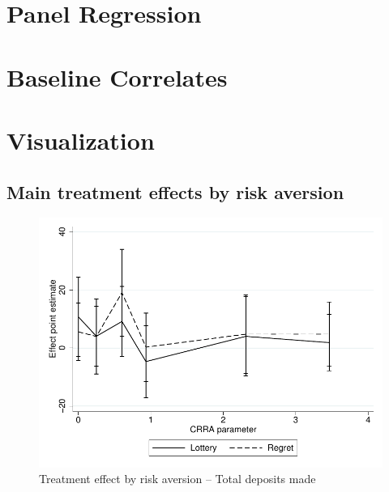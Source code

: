 \documentclass[11pt]{article}
\begin{document}
	\clearpage

\section{Panel Regression}

    
    

\clearpage

\section{Baseline Correlates}

    
    

\clearpage

\section{Visualization}

	\subsection{Main treatment effects by risk aversion}

		\begin{figure}[ht]
		\centering
		\caption{Treatment effect by risk aversion -- Total deposits made}
		\includegraphics[width=\textwidth]{../../figures/line-mobile_totdepositsbyrisk.pdf}
		\end{figure}

	\clearpage
\end{document}
